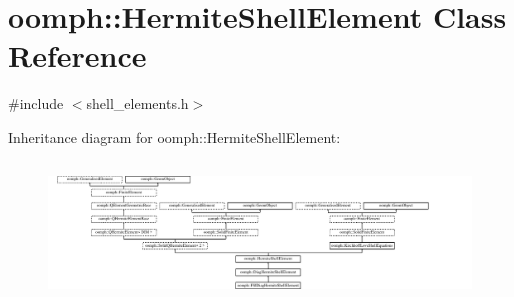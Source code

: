 \hypertarget{classoomph_1_1HermiteShellElement}{}\section{oomph\+:\+:Hermite\+Shell\+Element Class Reference}
\label{classoomph_1_1HermiteShellElement}


{\ttfamily \#include $<$shell\+\_\+elements.\+h$>$}

Inheritance diagram for oomph\+:\+:Hermite\+Shell\+Element\+:\begin{figure}[H]
\begin{center}
\leavevmode
\includegraphics[height=3.733333cm]{classoomph_1_1HermiteShellElement}
\end{center}
\end{figure}
